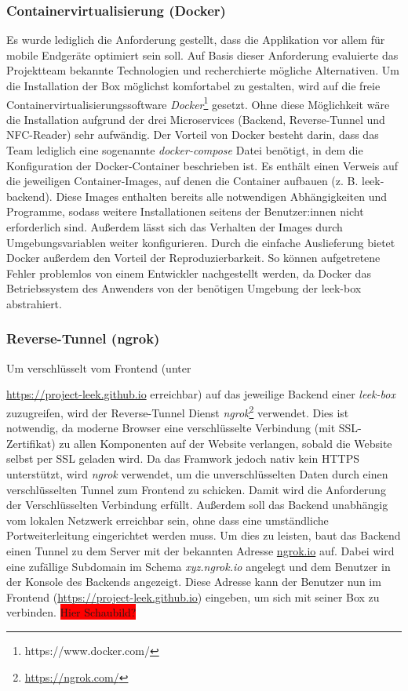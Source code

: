 \documentclass[10pt, a4paper]{article}
\begin{document}
\subsubsection{Containervirtualisierung (Docker)}
Es wurde lediglich die Anforderung gestellt, dass die Applikation vor allem für mobile Endgeräte optimiert sein soll.
Auf Basis dieser Anforderung evaluierte das Projektteam bekannte Technologien und recherchierte mögliche Alternativen.
Um die Installation der Box möglichst komfortabel zu gestalten, wird auf die freie Containervirtualisierungssoftware \textit{Docker}\footnote{https://www.docker.com/} gesetzt.
Ohne diese Möglichkeit wäre die Installation aufgrund der drei Microservices (Backend, Reverse-Tunnel und NFC-Reader) sehr aufwändig.
Der Vorteil von Docker besteht darin, dass das Team lediglich eine sogenannte \textit{docker-compose} Datei benötigt, in dem die Konfiguration der Docker-Container beschrieben ist.
Es enthält einen Verweis auf die jeweiligen Container-Images, auf denen die Container aufbauen (z. B. leek-backend). Diese Images enthalten bereits alle notwendigen Abhängigkeiten und Programme,
sodass weitere Installationen seitens der Benutzer:innen nicht erforderlich sind.
Außerdem lässt sich das Verhalten der Images durch Umgebungsvariablen weiter konfigurieren. Durch die einfache Auslieferung bietet Docker außerdem den Vorteil der Reproduzierbarkeit.
So können aufgetretene Fehler problemlos von einem Entwickler nachgestellt werden, da Docker das Betriebssystem des Anwenders von der benötigen Umgebung der leek-box abstrahiert.


\subsubsection{Reverse-Tunnel (ngrok)}
Um verschlüsselt vom Frontend (unter \raggedright\url{https://project-leek.github.io} erreichbar) auf das jeweilige Backend einer \textit{leek-box} zuzugreifen, wird der Reverse-Tunnel Dienst \textit{ngrok}\footnote{\raggedright\url{https://ngrok.com/}} verwendet.
Dies ist notwendig, da moderne Browser eine verschlüsselte Verbindung (mit SSL-Zertifikat) zu allen Komponenten auf der Website verlangen, sobald die Website selbst per SSL geladen wird.
Da das Framwork jedoch nativ kein HTTPS unterstützt, wird \textit{ngrok} verwendet, um die unverschlüsselten Daten durch einen verschlüsselten Tunnel zum Frontend zu schicken. Damit wird die Anforderung der Verschlüsselten Verbindung erfüllt.
Außerdem soll das Backend unabhängig vom lokalen Netzwerk erreichbar sein, ohne dass eine umständliche Portweiterleitung eingerichtet werden muss. Um dies zu leisten, baut das Backend einen Tunnel zu dem Server mit der bekannten Adresse \url{ngrok.io} auf.
Dabei wird eine zufällige Subdomain im Schema \textit{xyz.ngrok.io} angelegt und dem Benutzer in der Konsole des Backends angezeigt. Diese Adresse kann der Benutzer nun im Frontend (\url{https://project-leek.github.io}) eingeben, um sich mit seiner Box zu verbinden.
\colorbox{red}{Hier Schaubild?}
\end{document}
